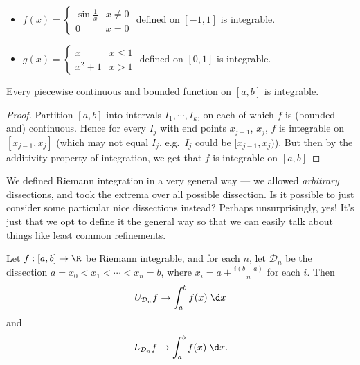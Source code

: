 \documentclass[a4paper]{article}
\begin{document}
\begin{eg}\leavevmode
  \begin{itemize}
    \item $f(x) =
      \begin{cases}
        \sin \frac{1}{x}& x \not = 0\\
        0 & x = 0
      \end{cases}$ defined on $[-1, 1]$ is integrable.
    \item $g(x) =
      \begin{cases}
        x & x \leq 1\\
        x^2 + 1 & x > 1
      \end{cases}$ defined on $[0, 1]$ is integrable.
  \end{itemize}
\end{eg}

\begin{cor}
  Every piecewise continuous and bounded function on $[a, b]$ is integrable.
\end{cor}

\begin{proof}
  Partition $[a, b]$ into intervals $I_1, \cdots, I_k$, on each of which $f$ is (bounded and) continuous. Hence for every $I_j$ with end points $x_{j - 1}$, $x_j$, $f$ is integrable on $[x_{j - 1}, x_j]$ (which may not equal $I_j$, e.g.\ $I_j$ could be $[x_{j - 1}, x_j)$). But then by the additivity property of integration, we get that $f$ is integrable on $[a, b]$
\end{proof}

We defined Riemann integration in a very general way --- we allowed \emph{arbitrary} dissections, and took the extrema over all possible dissection. Is it possible to just consider some particular nice dissections instead? Perhaps unsurprisingly, yes! It's just that we opt to define it the general way so that we can easily talk about things like least common refinements.
\begin{lemma}
  Let $f: [a, b] \to \R$ be Riemann integrable, and for each $n$, let $\mathcal{D}_n$ be the dissection $a = x_0 < x_1 < \cdots < x_n = b$, where $x_i = a + \frac{i(b - a)}{n}$ for each $i$. Then
  \[
    U_{\mathcal{D}_n}f \to \int_a^b f(x)\;\d x
  \]
  and
  \[
    L_{\mathcal{D}_n}f \to \int_a^b f(x)\;\d x.
  \]
\end{lemma}
\end{document}
